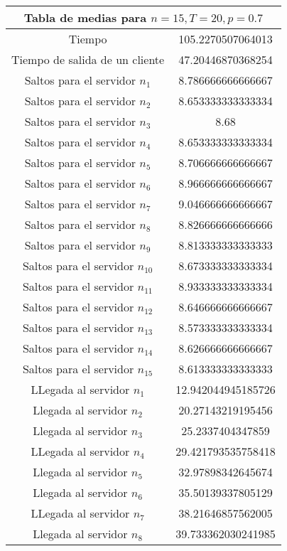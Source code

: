 \documentclass{article}
\begin{document}
\begin{table}[h]
\centering
\begin{tabular}{|c|c|}
\hline
\multicolumn{2}{|c|}{\textbf{Tabla de medias para $n=15,T=20,p=0.7$}} \\
\hline
Tiempo & 105.2270507064013\\
\hline
Tiempo de salida de un cliente & 47.20446870368254\\
\hline
Saltos para el servidor $n_1$ & 8.786666666666667\\
\hline
Saltos para el servidor $n_2$ & 8.653333333333334\\
\hline
Saltos para el servidor $n_3$ & 8.68\\
\hline
Saltos para el servidor $n_4$ & 8.653333333333334\\
\hline
Saltos para el servidor $n_5$ & 8.706666666666667\\
\hline
Saltos para el servidor $n_6$ & 8.966666666666667\\
\hline
Saltos para el servidor $n_7$ & 9.046666666666667\\
\hline
Saltos para el servidor $n_8$ & 8.826666666666666\\
\hline
Saltos para el servidor $n_9$ & 8.813333333333333\\
\hline
Saltos para el servidor $n_10$ & 8.673333333333334\\
\hline
Saltos para el servidor $n_11$ & 8.933333333333334\\
\hline
Saltos para el servidor $n_12$ & 8.646666666666667\\
\hline
Saltos para el servidor $n_13$ & 8.573333333333334\\
\hline
Saltos para el servidor $n_14$ & 8.626666666666667\\
\hline
Saltos para el servidor $n_15$ & 8.613333333333333\\
\hline
LLegada al servidor $n_1$ & 12.942044945185726\\
\hline
Llegada al servidor $n_2$ & 20.27143219195456\\
\hline
Llegada al servidor $n_3$ & 25.2337404347859\\
\hline
LLegada al servidor $n_4$ & 29.421793535758418\\
\hline
Llegada al servidor $n_5$ & 32.97898342645674\\
\hline
Llegada al servidor $n_6$ & 35.50139337805129\\
\hline
LLegada al servidor $n_7$ & 38.21646857562005\\
\hline
Llegada al servidor $n_8$ & 39.733362030241985\\

\end{tabular}
\end{table}
\end{document}

